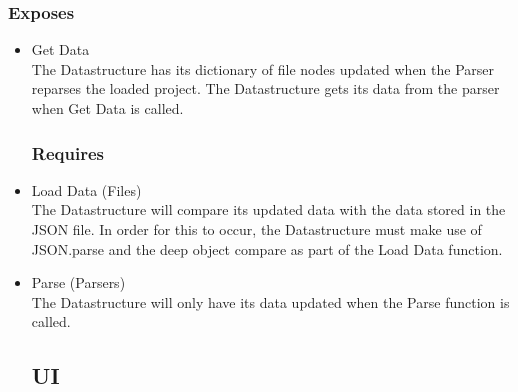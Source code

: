 \documentclass[letterpaper,10pt,titlepage,draftclsnofoot,onecolumn,onesided] {IEEEtran}
\begin{document}
		\subsubsection{Exposes}
		\begin{itemize}
			\item Get Data
			\\
			The Datastructure has its dictionary of file nodes updated when the Parser reparses the loaded project. 
			The Datastructure gets its data from the parser when Get Data is called.
		\subsubsection{Requires}
			\item Load Data (Files)
			\\
			The Datastructure will compare its updated data with the data stored in the JSON file. 
			In order for this to occur, the Datastructure must make use of JSON.parse and the deep object compare as part of the Load Data function.
			\item Parse (Parsers)
			\\
			The Datastructure will only have its data updated when the Parse function is called.
\subsection{UI}

\end{itemize}
\end{document}

